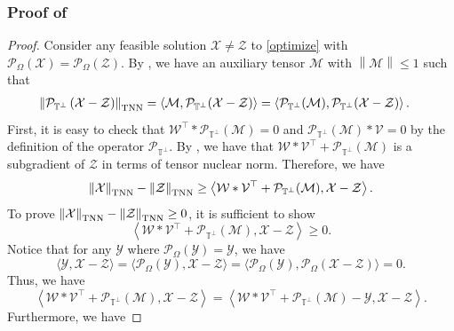 \documentclass[twoside,12pt]{article}
\newcommand{\TNN}{\textnormal{TNN}}
\begin{document}
\subsubsection{\textnormal{Proof of }}\label{proof:proposition1}
\vspace{-5pt}
\begin{proof}
Consider any feasible solution $\mathcal{X}\neq \mathcal{Z}$ to  \eqref{optimize} with $\mathcal{P}_{\Omega}(\mathcal{X}) = \mathcal{P}_{\Omega}(\mathcal{Z})$. By  , we have an auxiliary tensor $\mathcal{M}$ with $\left\|\mathcal{M}\right\| \leq 1$ such that 
\begin{align*}\left\|\mathcal{P}_{\mathbb{T}^{\perp}}\left(\mathcal{X}-\mathcal{Z}\right) \right\|_{\TNN} &= \left\langle \mathcal{M},\mathcal{P}_{\mathbb{T}^{\perp}}(\mathcal{X}-\mathcal{Z})\right\rangle=\left\langle \mathcal{P}_{\mathbb{T}^{\perp}}(\mathcal{M}),\mathcal{P}_{\mathbb{T}^{\perp}}(\mathcal{X}-\mathcal{Z})\right\rangle.
\end{align*}
First, it is easy to check that $\mathcal{W}^{\top}*\mathcal{P}_{\mathbb{T}^{\perp}}(\mathcal{M})=0$ and $\mathcal{P}_{\mathbb{T}^{\perp}}(\mathcal{M})*\mathcal{V}= 0$ by the definition of the operator $\mathcal{P}_{\mathbb{T}^{\perp}}$.
By , we have that $\mathcal{W}*\mathcal{V}^{\top}+\mathcal{P}_{\mathbb{T}^{\perp}}(\mathcal{M})$ is a subgradient of $\mathcal{Z}$ in terms of tensor nuclear norm.  Therefore, we have 
$$
\left\|\mathcal{X}\right\|_{\TNN} - \left\|\mathcal{Z}\right\|_{\TNN} \geq \left\langle \mathcal{W}*\mathcal{V}^{\top}+\mathcal{P}_{\mathbb{T}^{\perp}}(\mathcal{M}), \mathcal{X}-\mathcal{Z}\right\rangle.$$ 
\noindent To prove $ 
\left\|\mathcal{X}\right\|_{\TNN} - \left\|\mathcal{Z}\right\|_{\TNN} \geq 0$, it is sufficient to show 
\[\left\langle \mathcal{W}*\mathcal{V}^{\top}+\mathcal{P}_{\mathbb{T}^{\perp}}(\mathcal{M}), \mathcal{X}-\mathcal{Z}\right\rangle \geq 0.\] 
Notice that for any $\mathcal{Y}$ where $\mathcal{P}_{\Omega}(\mathcal{Y})=\mathcal{Y}$, we have $$\langle \mathcal{Y},\mathcal{X}-\mathcal{Z}\rangle=\langle \mathcal{P}_{\Omega}(\mathcal{Y}),\mathcal{X}-\mathcal{Z}\rangle=\langle \mathcal{P}_{\Omega}(\mathcal{Y}),\mathcal{P}_{\Omega}(\mathcal{X}-\mathcal{Z})\rangle=0.$$
Thus, we have 
\[\left\langle \mathcal{W}*\mathcal{V}^{\top}+\mathcal{P}_{\mathbb{T}^{\perp}}(\mathcal{M}),\mathcal{X}-\mathcal{Z}\right\rangle=\left\langle \mathcal{W}*\mathcal{V}^{\top}+\mathcal{P}_{\mathbb{T}^{\perp}}(\mathcal{M})-\mathcal{Y},\mathcal{X}-\mathcal{Z}\right\rangle. \]
Furthermore, we have 

\end{proof}
\end{document}
